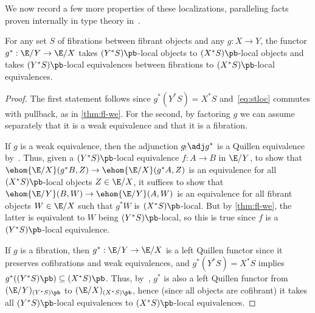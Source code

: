 We now record a few more properties of these localizations, paralleling facts proven internally in type theory in~\cite{rss:modalities}.

\begin{lem}\label{thm:pb-fl-fle}
  For any set $S$ of fibrations between fibrant objects and any $g:X\to Y$, the functor $g^*: \E/Y\to \E/X$ takes $(Y^*S)\pb$-local objects to $(X^*S)\pb$-local objects and takes $(Y^*S)\pb$-local equivalences between fibrations to $(X^*S)\pb$-local equivalences.
\end{lem}
\begin{proof}
  The first statement follows since $g^*(Y^*S) = X^*S$ and~\eqref{eq:stloc} commutes with pullback, as in \cref{thm:fl-we}.
  For the second, by factoring $g$ we can assume separately that it is a weak equivalence and that it is a fibration.

  If $g$ is a weak equivalence, then the adjunction $g_! \adj g^*$ is a Quillen equivalence by~\cite[Proposition 2.5]{rezk:proper}.
  Thus, given a $(Y^*S)\pb$-local equivalence $f:A\to B$ in $\E/Y$, to show that $\ehom{\E/X}(g^*B,Z) \to \ehom{\E/X}(g^*A,Z)$ is an equivalence for all $(X^*S)\pb$-local objects $Z\in\E/X$, it suffices to show that $\ehom{\E/Y}(B,W) \to \ehom{\E/Y}(A,W)$ is an equivalence for all fibrant objects $W\in \E/X$ such that $g^*W$ is $(X^*S)\pb$-local.
  But by \cref{thm:fl-we}, the latter is equivalent to $W$ being $(Y^*S)\pb$-local, so this is true since $f$ is a $(Y^*S)\pb$-local equivalence.

  If $g$ is a fibration, then $g^*:\E/Y\to \E/X$ is a left Quillen functor since it preserves cofibrations and weak equivalences, and $g^*(Y^*S) = X^*S$ implies $g^*((Y^*S)\pb) \subseteq (X^*S)\pb$.
  Thus, by~\cite[Proposition 3.3.18]{hirschhorn:modelcats}, $g^*$ is also a left Quillen functor from $(\E/Y)_{(Y^*S)\pb}$ to $(\E/X)_{(X^*S)\pb}$, hence (since all objects are cofibrant) it takes all $(Y^*S)\pb$-local equivalences to $(X^*S)\pb$-local equivalences.
\end{proof}

